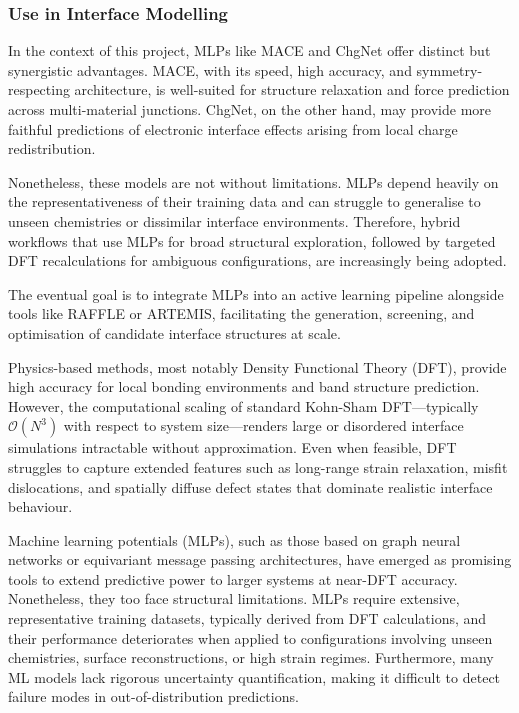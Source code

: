 \subsubsection{Use in Interface Modelling}

In the context of this project, MLPs like MACE and ChgNet offer distinct but synergistic advantages. MACE, with its speed, high accuracy, and symmetry-respecting architecture, is well-suited for structure relaxation and force prediction across multi-material junctions. ChgNet, on the other hand, may provide more faithful predictions of electronic interface effects arising from local charge redistribution.

Nonetheless, these models are not without limitations. MLPs depend heavily on the representativeness of their training data and can struggle to generalise to unseen chemistries or dissimilar interface environments. Therefore, hybrid workflows that use MLPs for broad structural exploration, followed by targeted DFT recalculations for ambiguous configurations, are increasingly being adopted.

The eventual goal is to integrate MLPs into an active learning pipeline alongside tools like RAFFLE or ARTEMIS, facilitating the generation, screening, and optimisation of candidate interface structures at scale.

Physics-based methods, most notably Density Functional Theory (DFT), provide high accuracy for local bonding environments and band structure prediction. However, the computational scaling of standard Kohn-Sham DFT---typically $\mathcal{O}(N^3)$ with respect to system size---renders large or disordered interface simulations intractable without approximation. Even when feasible, DFT struggles to capture extended features such as long-range strain relaxation, misfit dislocations, and spatially diffuse defect states that dominate realistic interface behaviour.

Machine learning potentials (MLPs), such as those based on graph neural networks or equivariant message passing architectures, have emerged as promising tools to extend predictive power to larger systems at near-DFT accuracy. Nonetheless, they too face structural limitations. MLPs require extensive, representative training datasets, typically derived from DFT calculations, and their performance deteriorates when applied to configurations involving unseen chemistries, surface reconstructions, or high strain regimes. Furthermore, many ML models lack rigorous uncertainty quantification, making it difficult to detect failure modes in out-of-distribution predictions.

